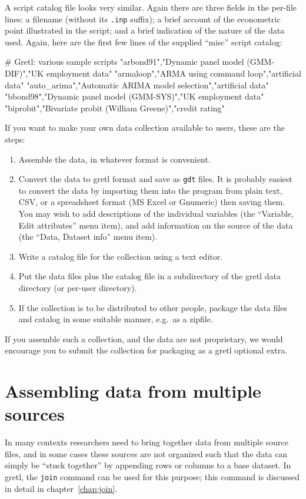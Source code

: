 A script catalog file looks very similar. Again there are three
fields in the per-file lines: a filename (without its \verb+.inp+ suffix);
a brief account of the econometric point illustrated in the
script; and a brief indication of the nature of the data used.  Again,
here are the first few lines of the supplied ``misc'' script catalog:

\begin{code}
# Gretl: various sample scripts
"arbond91","Dynamic panel model (GMM-DIF)","UK employment data"
"armaloop","ARMA using command loop","artificial data"
"auto_arima","Automatic ARIMA model selection","artificial data"
"bbond98","Dynamic panel model (GMM-SYS)","UK employment data"
"biprobit","Bivariate probit (William Greene)","credit rating"
\end{code}

If you want to make your own data collection available to users, these
are the steps:

\begin{enumerate}
\item Assemble the data, in whatever format is convenient.
\item Convert the data to gretl format and save as \verb+gdt+
  files.  It is probably easiest to convert the data by importing them
  into the program from plain text, CSV, or a spreadsheet format (MS
  Excel or Gnumeric) then saving them. You may wish to add
  descriptions of the individual variables (the ``Variable, Edit
  attributes'' menu item), and add information on the source of the
  data (the ``Data, Dataset info'' menu item).
\item Write a catalog file for the collection using a text editor.
\item Put the data files plus the catalog file in a subdirectory of
  the gretl data directory (or per-user directory).
\item If the collection is to be distributed to other people, package
  the data files and catalog in some suitable manner, e.g.\ as a
  zipfile.
\end{enumerate}

If you assemble such a collection, and the data are not proprietary, we
would encourage you to submit the collection for packaging as a
gretl optional extra.

\section{Assembling data from multiple sources}

In many contexts researchers need to bring together data from multiple
source files, and in some cases these sources are not organized such
that the data can simply be ``stuck together'' by appending rows or
columns to a base dataset. In gretl, the \texttt{join} command
can be used for this purpose; this command is discussed in detail in
chapter~\ref{chap:join}.



